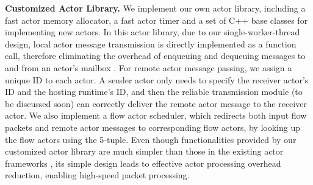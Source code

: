 \vspace{1mm}
\noindent \textbf{Customized Actor Library.} We implement our own actor library, including a fast actor memory allocator, a fast actor timer and a set of C++ base classes for implementing new actors. %
In this actor library, due to our single-worker-thread design, local actor message transmission is directly implemented as a function call, therefore eliminating the overhead of enqueuing and dequeuing messages to and from an actor's mailbox \cite{actor-wiki}. For remote actor message passing, we assign a unique ID to each actor. A sender actor only needs to specify the receiver actor's ID and the hosting runtime's ID, and then the reliable transmission module (to be discussed soon) can correctly deliver the remote actor message to the receiver actor. We also implement a flow actor scheduler, %
 which redirects both input flow packets and remote actor messages to corresponding flow actors, by looking up the flow actors using the 5-tuple.
 Even though functionalities provided by our customized actor library are much simpler than those in the existing actor frameworks \cite{akka} \cite{caf}, its simple design leads to effective actor processing overhead reduction, enabling high-speed packet processing. %





